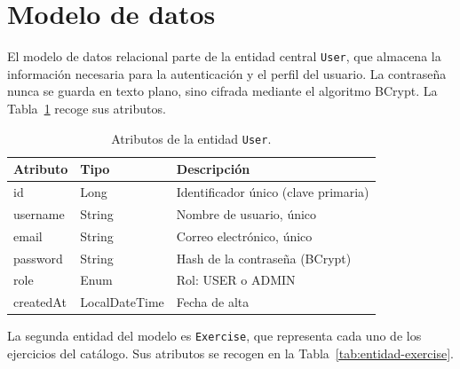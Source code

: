 \documentclass[12pt,a4paper,twoside,openright]{book}
\begin{document}
    \section{Modelo de datos}

    El modelo de datos relacional parte de la entidad central \texttt{User}, que
    almacena la información necesaria para la autenticación y el perfil del
    usuario. La contraseña nunca se guarda en texto plano, sino cifrada
    mediante el algoritmo BCrypt. La Tabla~\ref{tab:entidad-user} recoge sus
    atributos.

    \begin{table}[htbp]
        \centering
        \begin{tabular}{lll}
            \toprule
            \textbf{Atributo} & \textbf{Tipo} & \textbf{Descripción} \\
            \midrule
            id        & Long          & Identificador único (clave primaria) \\
            username  & String        & Nombre de usuario, único \\
            email     & String        & Correo electrónico, único \\
            password  & String        & Hash de la contraseña (BCrypt) \\
            role      & Enum          & Rol: USER o ADMIN \\
            createdAt & LocalDateTime & Fecha de alta \\
        \bottomrule
        \end{tabular}
        \caption{Atributos de la entidad \texttt{User}.}
        \label{tab:entidad-user}
    \end{table}

    La segunda entidad del modelo es \texttt{Exercise}, que representa cada
    uno de los ejercicios del catálogo. Sus atributos se recogen en la
    Tabla~\ref{tab:entidad-exercise}.
\end{document}
